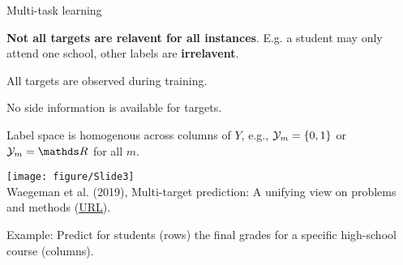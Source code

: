 \documentclass[11pt,compress,t,notes=noshow, xcolor=table]{beamer}
\begin{document}
\begin{frame}{Multi-task learning}

		\begin{itemize}\small
			
			\begin{minipage}{0.45\textwidth}  

                \item \textbf{Not all targets are relavent for all instances}. E.g. a student may only attend one school, other labels are \textbf{irrelavent}.
                \vspace{10pt}
                
                \item All targets are observed during training.
                \vspace{10pt}

			    \item No side information is available for targets. 
                \vspace{10pt}
       
				\item Label space is homogenous across columns of $Y$, e.g., $\mathcal{Y}_m = \{0,1\}$ or $\Yspace_m = \R$ for all $m$.
                \vspace{10pt}

			\end{minipage}
            \hfill
			\begin{minipage}{0.45\textwidth}    
				\begin{center} 	
					\texttt{[image: figure/Slide3]} \tiny
					\\ Waegeman et al. (2019), Multi-target prediction:
					A unifying view on problems and methods (\href{https://arxiv.org/pdf/1809.02352.pdf}{\underline{URL}}).	
				\end{center}
			\end{minipage}
		\end{itemize}
    \vspace{10pt}
	Example: Predict for students (rows) the final grades for a specific high-school course (columns).


\end{frame}
\end{document}
